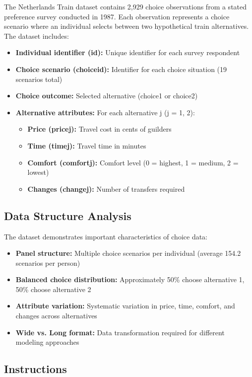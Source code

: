 \documentclass[11pt]{article}
\begin{document}
The Netherlands Train dataset contains 2,929 choice observations from a stated preference survey conducted in 1987. Each observation represents a choice scenario where an individual selects between two hypothetical train alternatives. The dataset includes:

\begin{itemize}
\item \textbf{Individual identifier (id):} Unique identifier for each survey respondent
\item \textbf{Choice scenario (choiceid):} Identifier for each choice situation (19 scenarios total)
\item \textbf{Choice outcome:} Selected alternative (choice1 or choice2)
\item \textbf{Alternative attributes:} For each alternative j (j = 1, 2):
\begin{itemize}
\item \textbf{Price (pricej):} Travel cost in cents of guilders
\item \textbf{Time (timej):} Travel time in minutes
\item \textbf{Comfort (comfortj):} Comfort level (0 = highest, 1 = medium, 2 = lowest)
\item \textbf{Changes (changej):} Number of transfers required
\end{itemize}
\end{itemize}

\subsection*{Data Structure Analysis}

The dataset demonstrates important characteristics of choice data:
\begin{itemize}
\item \textbf{Panel structure:} Multiple choice scenarios per individual (average 154.2 scenarios per person)
\item \textbf{Balanced choice distribution:} Approximately 50\% choose alternative 1, 50\% choose alternative 2
\item \textbf{Attribute variation:} Systematic variation in price, time, comfort, and changes across alternatives
\item \textbf{Wide vs. Long format:} Data transformation required for different modeling approaches
\end{itemize}

\subsection*{Instructions}
\end{document}

